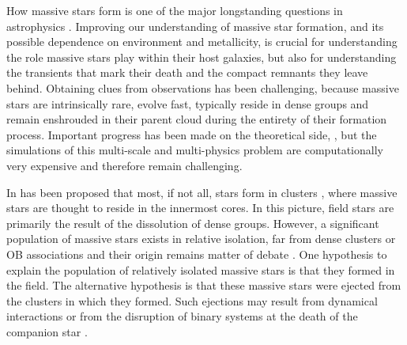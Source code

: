 \documentclass[apjl,twocolumn]{emulateapj}
\begin{document}
How massive stars form is one of the major longstanding questions in astrophysics
\citep[e.g.,][]{zinnecker:07}. Improving our understanding of massive star formation, and its
possible dependence on environment and metallicity, is crucial for understanding the role massive stars play within their host galaxies, but also for understanding the transients that mark their death and the compact remnants they leave behind.
%
Obtaining clues from observations has been challenging, because massive stars are intrinsically rare, 
evolve fast, typically reside in dense groups and remain enshrouded in
their parent cloud during the entirety of their formation
process. Important progress has been made on the theoretical side,
\citep[e.g.][]{bate:09,kuiper:15,rosen:16}, but the simulations of this multi-scale and multi-physics problem are computationally very expensive and therefore remain challenging.  

In has been proposed that most, if not all, stars form in clusters \citep{lada:03}, where massive stars are thought to reside in the innermost cores. In this picture, field stars are primarily the result of the dissolution of dense groups.  However, a significant population of massive stars exists in relative isolation, far from dense clusters or OB associations and their origin remains matter of debate \citep{gvaramadze:12, lamb:16,ward:18}.   One hypothesis to explain the population of relatively isolated massive stars is that they formed in the field. The alternative hypothesis is that these massive stars were ejected from the clusters in which they formed.  Such ejections may result from dynamical interactions \citep[e.g.,][]{poveda:67} or from the disruption of binary systems at the death of the companion  star \citep[e.g.,][]{zwicky:57, blaauw:61, renzo:18}. 
 
\end{document}
